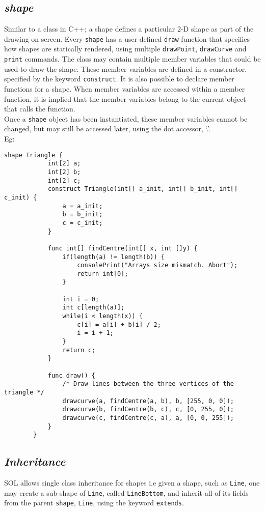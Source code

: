 \documentclass[letterpaper,12pt]{article}
\begin{document}
\subsection{\textit{shape}}
Similar to a class in C++; a shape defines a particular 2-D shape as part of the drawing on screen. Every \texttt{shape} has a user-defined \texttt{draw} function that specifies how shapes are statically rendered, using multiple \texttt{drawPoint}, \texttt{drawCurve} and \texttt{print} commands. The class may contain multiple member variables that could be used to draw the shape. These member variables are defined in a constructor, specified by the keyword \texttt{construct}. It is also possible to declare member functions for a shape. When member variables are accessed within a member function, it is implied that the member variables belong to the current object that calls the function.\\
Once a \texttt{shape} object has been instantiated, these member variables cannot be changed, but may still be accessed later, using the dot accessor, `.'.\\
Eg: \begin{lstlisting}[aboveskip=-13pt]
        shape Triangle {
            int[2] a;
            int[2] b;
            int[2] c;
            construct Triangle(int[] a_init, int[] b_init, int[] c_init) {
                a = a_init;
                b = b_init;
                c = c_init;
            }
        
            func int[] findCentre(int[] x, int []y) {
                if(length(a) != length(b)) {
                    consolePrint("Arrays size mismatch. Abort");
                    return int[0];
                }
            
                int i = 0;
                int c[length(a)];
                while(i < length(x)) {
                    c[i] = a[i] + b[i] / 2;
                    i = i + 1;
                }
                return c;
            }

            func draw() {
                /* Draw lines between the three vertices of the triangle */
                drawcurve(a, findCentre(a, b), b, [255, 0, 0]);
                drawcurve(b, findCentre(b, c), c, [0, 255, 0]);
                drawcurve(c, findCentre(c, a), a, [0, 0, 255]);
            }
        }
    \end{lstlisting}

\subsection{\textit{Inheritance}}
SOL allows single class inheritance for shapes i.e given a shape, such as \texttt{Line}, one may create a sub-shape of \texttt{Line}, called \texttt{LineBottom}, and inherit all of its fields from the parent \texttt{shape}, \texttt{Line}, using the keyword \texttt{extends}.\\
\end{document}
